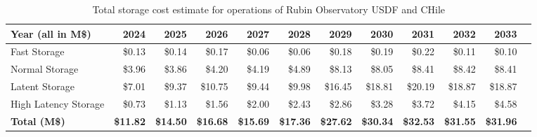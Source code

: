 \tiny \begin{longtable} { |p{}  |r  |r  |r  |r  |r  |r  |r  |r  |r  |r  |r |} 
\caption{Total storage cost estimate for operations of Rubin Observatory USDF and CHile \label{tab:opsStorageCost}}\\ 
\hline 
\textbf{Year (all in M\$)}&\textbf{2024}&\textbf{2025}&\textbf{2026}&\textbf{2027}&\textbf{2028}&\textbf{2029}&\textbf{2030}&\textbf{2031}&\textbf{2032}&\textbf{2033} \\ \hline
{Fast Storage}&{\$0.13}&{\$0.14}&{\$0.17}&{\$0.06}&{\$0.06}&{\$0.18}&{\$0.19}&{\$0.22}&{\$0.11}&{\$0.10} \\ \hline
{Normal Storage}&{\$3.96}&{\$3.86}&{\$4.20}&{\$4.19}&{\$4.89}&{\$8.13}&{\$8.05}&{\$8.41}&{\$8.42}&{\$8.41} \\ \hline
{Latent Storage}&{\$7.01}&{\$9.37}&{\$10.75}&{\$9.44}&{\$9.98}&{\$16.45}&{\$18.81}&{\$20.19}&{\$18.87}&{\$18.87} \\ \hline
{High Latency Storage}&{\$0.73}&{\$1.13}&{\$1.56}&{\$2.00}&{\$2.43}&{\$2.86}&{\$3.28}&{\$3.72}&{\$4.15}&{\$4.58} \\ \hline
\textbf{Total (M\$)}&\textbf{\$11.82}&\textbf{\$14.50}&\textbf{\$16.68}&\textbf{\$15.69}&\textbf{\$17.36}&\textbf{\$27.62}&\textbf{\$30.34}&\textbf{\$32.53}&\textbf{\$31.55}&\textbf{\$31.96} \\ \hline
\end{longtable} \normalsize
